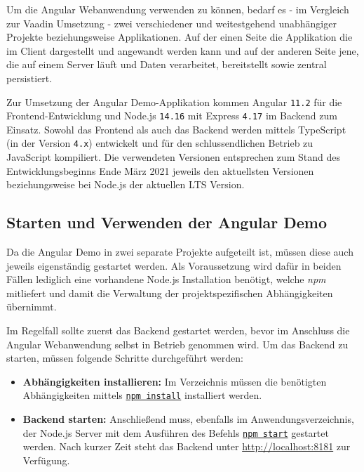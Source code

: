 \documentclass[a4paper,12pt,twoside]{scrreprt}
\begin{document}
Um die Angular Webanwendung verwenden zu können, bedarf es - im Vergleich zur Vaadin Umsetzung - zwei verschiedener und weitestgehend unabhängiger Projekte beziehungsweise Applikationen. Auf der einen Seite die Applikation die im Client dargestellt und angewandt werden kann und auf der anderen Seite jene, die auf einem Server läuft und Daten verarbeitet, bereitstellt sowie zentral persistiert.

\medskip

Zur Umsetzung der Angular Demo-Applikation kommen Angular \texttt{11.2} für die Frontend-Entwicklung und Node.js \texttt{14.16} mit Express \texttt{4.17} im Backend zum Einsatz. Sowohl das Frontend als auch das Backend werden mittels TypeScript (in der Version \texttt{4.x}) entwickelt und für den schlussendlichen Betrieb zu JavaScript kompiliert. Die verwendeten Versionen entsprechen zum Stand des Entwicklungsbeginns Ende März 2021 jeweils den aktuellsten Versionen beziehungsweise bei Node.js der aktuellen \ac{LTS} Version.

\subsection{Starten und Verwenden der Angular Demo}
\label{sub-sec:starten-verwenden-angular}
Da die Angular Demo in zwei separate Projekte aufgeteilt ist, müssen diese auch jeweils eigenständig gestartet werden. Als Voraussetzung wird dafür in beiden Fällen lediglich eine vorhandene Node.js Installation benötigt, welche \textit{npm} mitliefert und damit die Verwaltung der projektspezifischen Abhängigkeiten übernimmt.

\medskip

Im Regelfall sollte zuerst das Backend gestartet werden, bevor im Anschluss die Angular Webanwendung selbst in Betrieb genommen wird. Um das Backend zu starten, müssen folgende Schritte durchgeführt werden:

\clearpage

\begin{itemize}
    \item \textbf{Abhängigkeiten installieren:} Im Verzeichnis  müssen die benötigten Abhängigkeiten mittels \underline{\texttt{npm install}} installiert werden.
    \item \textbf{Backend starten:} Anschließend muss, ebenfalls im Anwendungsverzeichnis, der Node.js Server mit dem Ausführen des Befehls \underline{\texttt{npm start}} gestartet werden. Nach kurzer Zeit steht das Backend unter \url{http://localhost:8181} zur Verfügung.
\end{itemize}
\end{document}

